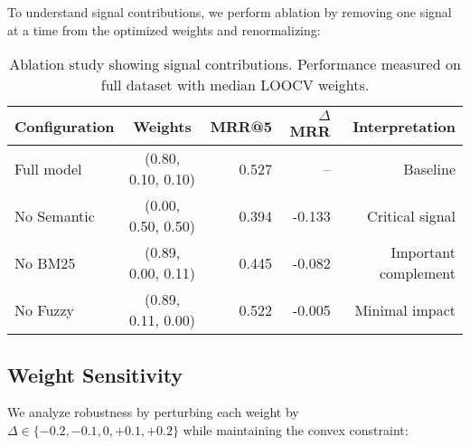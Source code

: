 To understand signal contributions, we perform ablation by removing one signal at a time from the optimized weights and renormalizing:

\begin{table}[H]
\centering
\small
\begin{tabular}{lcrrr}
\toprule
\textbf{Configuration} & \textbf{Weights} & \textbf{MRR@5} & \textbf{$\Delta$ MRR} & \textbf{Interpretation} \\
\midrule
Full model & (0.80, 0.10, 0.10) & 0.527 & -- & Baseline \\
No Semantic & (0.00, 0.50, 0.50) & 0.394 & -0.133 & Critical signal \\
No BM25 & (0.89, 0.00, 0.11) & 0.445 & -0.082 & Important complement \\
No Fuzzy & (0.89, 0.11, 0.00) & 0.522 & -0.005 & Minimal impact \\
\bottomrule
\end{tabular}
\caption{Ablation study showing signal contributions. Performance measured on full dataset with median LOOCV weights.}
\label{tab:ablation}
\end{table}

\subsection{Weight Sensitivity}

We analyze robustness by perturbing each weight by $\Delta \in \{-0.2, -0.1, 0, +0.1, +0.2\}$ while maintaining the convex constraint:

\vspace{0.5em}
\noindent
\begin{minipage}{\textwidth}
\centering
{}
\label{fig:sensitivity}
\end{minipage}
\vspace{0.5em}

